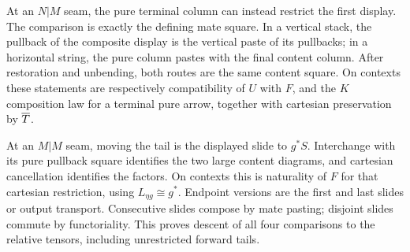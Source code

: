 \documentclass[11pt]{article}
\numberwithin{equation}{section}
\theoremstyle{definition}\newtheorem{definition}[theorem]{Definition}
\begin{document}
At an $N|M$ seam, the pure terminal column can instead restrict the first
display. The comparison is exactly the defining mate square. In a
vertical stack, the pullback of the composite display is the vertical
paste of its pullbacks; in a horizontal string, the pure column pastes
with the final content column. After restoration and unbending, both
routes are the same content square. On contexts these statements are
respectively compatibility of $U$ with $F$, and the $K$ composition law
for a terminal pure arrow, together with cartesian preservation by $\overline T$.

At an $M|M$ seam, moving the tail is the displayed slide to $g^*S$.
Interchange with its pure pullback square identifies the two large
content diagrams, and cartesian cancellation identifies the factors.
On contexts this is naturality of $F$ for that cartesian restriction,
using $L_{\eta g}\cong g^*$. Endpoint versions are the first and last
slides or output transport. Consecutive slides compose by mate pasting;
disjoint slides commute by functoriality. This proves descent of all four
comparisons to the relative tensors, including unrestricted forward tails.
\end{document}
